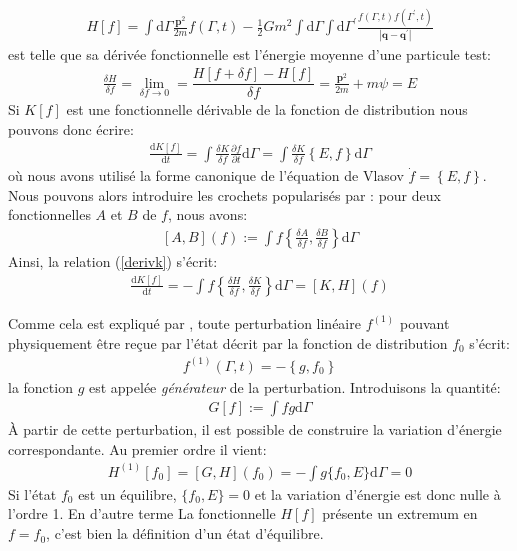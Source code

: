 \begin{align*}
	H \left[ f \right]  =
	\int \mathrm{d} {\Gamma}
		\frac{\mathbf{p}^{2}}{2m} f \left( {\Gamma},t \right)
	- \frac{1}{2} Gm^2 \int \mathrm{d} {\Gamma} \int\mathrm{d}{\Gamma}^{\prime}
		\frac{f \left({\Gamma},t \right) f\left( {\Gamma}^{\prime},t\right)}%
		{\left\vert \mathbf{q} - \mathbf{q}^{\prime} \right\vert }
\end{align*}
est telle que sa dérivée fonctionnelle est l'énergie moyenne d'une particule test:
\begin{align*}
	\frac{\delta H}{\delta f}=\lim_{\delta f \to 0}=\dfrac{H\left[ f +\delta f\right]-H \left[ f \right]}{\delta f}
	= \frac{\mathbf{p}^{2}}{2m} + m \psi=E
\end{align*}
Si $K[f]$ est une fonctionnelle dérivable de la fonction de distribution nous pouvons donc écrire:
\begin{align}
	\frac{\mathrm{d} K[f]}{\mathrm{d} t}
	= \int \frac{\delta K}{\delta f}
		\frac{\partial f}{\partial t} \mathrm{d} \Gamma
	= \int \frac{\delta K}{\delta f} \left\{ E, f \right\} \mathrm{d} \Gamma
	\label{derivk}
\end{align}
où nous avons utilisé la forme canonique de l'équation de Vlasov $\dot f=\left\{ E, f \right\}$.
Nous pouvons alors introduire les crochets popularisés par \cite{morrison}: pour deux fonctionnelles $A$ et $B$ de $f$, nous avons:
\begin{align*}
	\left[ A, B \right](f) :=
	\int f \left\{
		\frac{\delta A}{\delta f}, \frac{\delta B}{\delta f}
	\right\} \mathrm{d} \Gamma
\end{align*}
Ainsi, la relation (\ref{derivk}) s'écrit:
\begin{align}
	\frac{\mathrm{d} K[f]}{\mathrm{d} t}
	= - \int f \left\{
		\frac{\delta H}{\delta f}, \frac{\delta K}{\delta f}
	\right\} \mathrm{d} \Gamma
	= \left[K, H \right](f)
\end{align}

Comme cela est expliqué par \cite{kandrupstability}, toute perturbation linéaire $f^{(1)}$ pouvant physiquement être reçue par l'état décrit par la
fonction de distribution $f_0$ s'écrit:
\begin{align*}
	f^{(1)}\left(  {\Gamma},t \right) = -\left\{ g,f_{0}\right\}
\end{align*}
la fonction $g$ est appelée \emph{générateur} de la perturbation. Introduisons la quantité:
\begin{align*}
	G[f] := \int f g \mathrm{d} \Gamma
\end{align*}
À partir de cette perturbation, il est possible de construire la variation d'énergie correspondante. Au  premier ordre il vient:
\begin{align*}
	H^{(1)} [f_0] = \left[G, H \right](f_0)
	= - \int g \{ f_0, E \} \mathrm{d} \Gamma
	= 0
\end{align*}
Si l'état $f_0$ est un équilibre, $\{ f_0, E \} = 0$ et la variation d'énergie est donc nulle à l'ordre 1. En d'autre terme La fonctionnelle $H[f]$
présente un extremum en $f=f_0$, c'est bien la définition d'un état d'équilibre.

